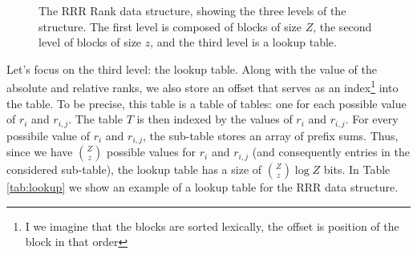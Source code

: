 \begin{figure}[h]
\begin{flushright}
    \end{flushright}
    \caption{The RRR Rank data structure, showing the three levels of the structure. The first level is composed of blocks of size $Z$, the second level of blocks of size $z$, and the third level is a lookup table.} \label{fig:RRR}
\end{figure}

\noindent Let's focus on the third level: the lookup table. Along with the value of the absolute and relative ranks, we also store an offset that serves as an index\footnote{I we imagine that the blocks are sorted lexically, the offset is position of the block in that order} into the table. To be precise, this table is a table of tables: one for each possible value of $r_i$ and $r_{i,j}$. The table $T$ is then indexed by the values of $r_i$ and $r_{i,j}$. For every possibile value of $r_i$ and $r_{i,j}$, the sub-table stores an array of prefix sums. Thus, since we have $\binom{Z}{z}$ possible values for $r_i$ and $r_{i,j}$ (and consequently entries in the considered sub-table), the lookup table has a size of $\binom{Z}{z}\log Z$ bits. In Table \ref{tab:lookup} we show an example of a lookup table for the RRR data structure. \vspace{0.4cm}

